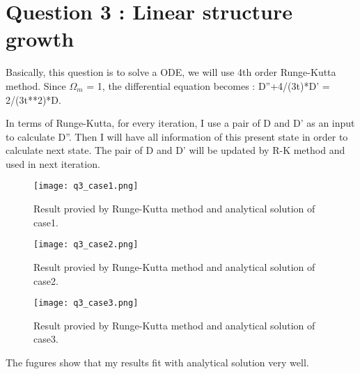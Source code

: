 \section{Question 3 : Linear structure growth}
Basically, this question is to solve a ODE, we will use 4th order Runge-Kutta method.
Since $\Omega_m$ = 1, the differential equation becomes :
D''+4/(3t)*D' = 2/(3t**2)*D.

In terms of Runge-Kutta, for every iteration, I use a pair of D and D' as an input to calculate D''. Then I will have all information of this present state in order to calculate next state. The pair of D and D' will be updated by R-K method and used
in next iteration.



\begin{figure}
  \centering
  \texttt{[image: q3\_case1.png]}
  \caption{Result provied by Runge-Kutta method and analytical solution of case1.}
  \label{fig:q3_case1}
\end{figure}

\begin{figure}
  \centering
  \texttt{[image: q3\_case2.png]}
  \caption{Result provied by Runge-Kutta method and analytical solution of case2.}
  \label{fig:q3_case2}
\end{figure}

\begin{figure}
  \centering
  \texttt{[image: q3\_case3.png]}
  \caption{Result provied by Runge-Kutta method and analytical solution of case3.}
  \label{fig:q3_case2}
\end{figure}

The fugures show that my results fit with analytical solution very well.